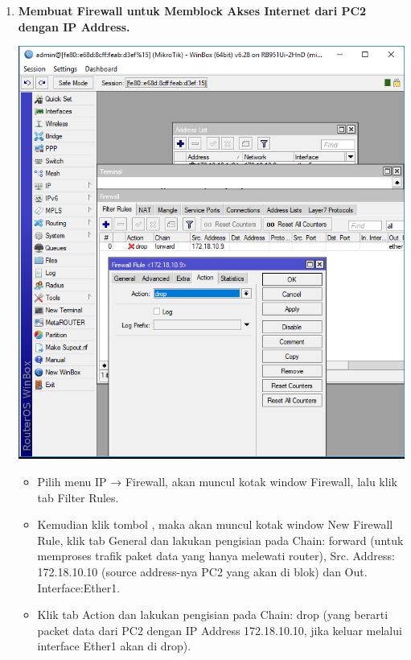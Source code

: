 \documentclass[a4paper,12pt]{article}
\begin{document}
\begin{enumerate}[label=\textbf{\arabic*.}]
    \item \textbf{Membuat Firewall untuk Memblock Akses Internet dari PC2 dengan IP Address.}
        \begin{center}
            \includegraphics[width=0.8\linewidth]{image15.png}
        \end{center}
        \begin{itemize}
            \item Pilih menu IP → Firewall, akan muncul kotak window Firewall, lalu klik tab Filter Rules.
            \item Kemudian klik tombol , maka akan muncul kotak window New Firewall Rule, klik tab General dan lakukan pengisian pada Chain: forward (untuk memproses trafik paket data yang hanya melewati router), Src. Address: 172.18.10.10 (source address-nya PC2 yang akan di blok) dan Out. Interface:Ether1.
            \item Klik tab Action dan lakukan pengisian pada Chain: drop (yang berarti packet data dari PC2 dengan IP Address 172.18.10.10, jika keluar melalui interface Ether1 akan di drop).
        \end{itemize}


\end{enumerate}
\end{document}
